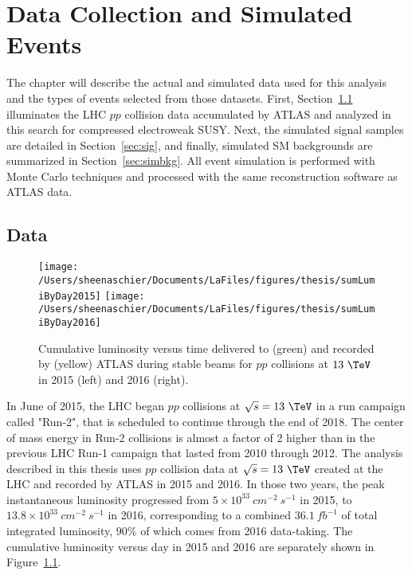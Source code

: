 \chapter{Data Collection and Simulated Events}
\label{ch:data}
The chapter will describe the actual and simulated data used for this analysis and the types of events selected from those datasets.  First, Section~\ref{sec:data} illuminates the LHC $pp$ collision data accumulated by ATLAS and analyzed in this search for compressed electroweak SUSY.  Next, the simulated signal samples are detailed in Section~\ref{sec:sig}, and finally, simulated SM backgrounds are summarized in Section~\ref{sec:simbkg}.  All event simulation is performed with Monte Carlo techniques and processed with the same reconstruction software as ATLAS data.  
 
\section{Data}
\label{sec:data}

 \begin{figure}[tbp]
 \texttt{[image: /Users/sheenaschier/Documents/LaFiles/figures/thesis/sumLumiByDay2015]}
 \texttt{[image: /Users/sheenaschier/Documents/LaFiles/figures/thesis/sumLumiByDay2016]}\\
 \caption{Cumulative luminosity versus time delivered to (green) and recorded by (yellow) ATLAS during stable beams for $pp$ collisions at $13~\TeV$ in 2015 (left) and 2016 (right).}
 \label{fig:lumi}
 \end{figure}
In June of 2015, the LHC began $pp$ collisions at $\sqrt{s}=13~\TeV$ in a run campaign called "Run-2", that is scheduled to continue through the end of 2018.  The center of mass energy in Run-2 collisions is almost a factor of 2 higher than in the previous LHC Run-1 campaign that lasted from 2010 through 2012. The analysis described in this thesis uses $pp$ collision data at $\sqrt{s}=13~\TeV$ created at the LHC and recorded by ATLAS in 2015 and 2016.  In those two years, the peak instantaneous luminosity progressed from $5\times10^{33}~cm^{-2}~s^{-1}$ in 2015, to $13.8\times10^{33}~cm^{-2}~s^{-1}$ in 2016, corresponding to a combined $36.1~fb^{-1}$ of total integrated luminosity, $90\%$ of which comes from 2016 data-taking.  The cumulative luminosity versus day in 2015 and 2016 are separately shown in Figure~\ref{fig:lumi}.

